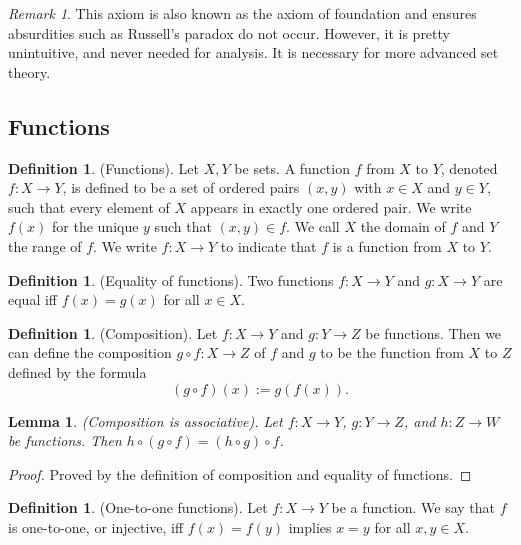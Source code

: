\documentclass[12pt]{article}
\newtheorem{lemma}[theorem]{Lemma}
\theoremstyle{definition}
\newtheorem{definition}[theorem]{Definition}
\theoremstyle{remark}
\newtheorem*{remark}{Remark}
\begin{document}
\begin{remark}
    This axiom is also known as the axiom of foundation and ensures absurdities such as Russell's paradox do not occur. However, it is pretty unintuitive, and never needed for analysis. It is necessary for more advanced set theory.
\end{remark}

\subsection{Functions}

\begin{definition}
    (Functions). Let $X, Y$ be sets. A function $f$ from $X$ to $Y$, denoted $f \colon X \to Y$, is defined to be a set of ordered pairs $(x, y)$ with $x \in X$ and $y \in Y$, such that every element of $X$ appears in exactly one ordered pair. We write $f(x)$ for the unique $y$ such that $(x, y) \in f$. We call $X$ the domain of $f$ and $Y$ the range of $f$. We write $f \colon X \to Y$ to indicate that $f$ is a function from $X$ to $Y$.
\end{definition}

\begin{definition}
    (Equality of functions). Two functions $f \colon X \to Y$ and $g \colon X \to Y$ are equal iff $f(x) = g(x)$ for all $x \in X$.
\end{definition}

\begin{definition}
    (Composition). Let $f \colon X \to Y$ and $g \colon Y \to Z$ be functions. Then we can define the composition $g \circ f \colon X \to Z$ of $f$ and $g$ to be the function from $X$ to $Z$ defined by the formula \[
    (g \circ f)(x) := g(f(x))
    .\]
\end{definition}

\begin{lemma}
    (Composition is associative). Let $f \colon X \to Y$, $g \colon Y \to Z$, and $h \colon Z \to W$ be functions. Then $h \circ (g \circ f) = (h \circ g) \circ f$.
\end{lemma}

\begin{proof}
    Proved by the definition of composition and equality of functions.
\end{proof}

\begin{definition}
    (One-to-one functions). Let $f \colon X \to Y$ be a function. We say that $f$ is one-to-one, or injective, iff $f(x) = f(y)$ implies $x = y$ for all $x, y \in X$.
\end{definition}
\end{document}
